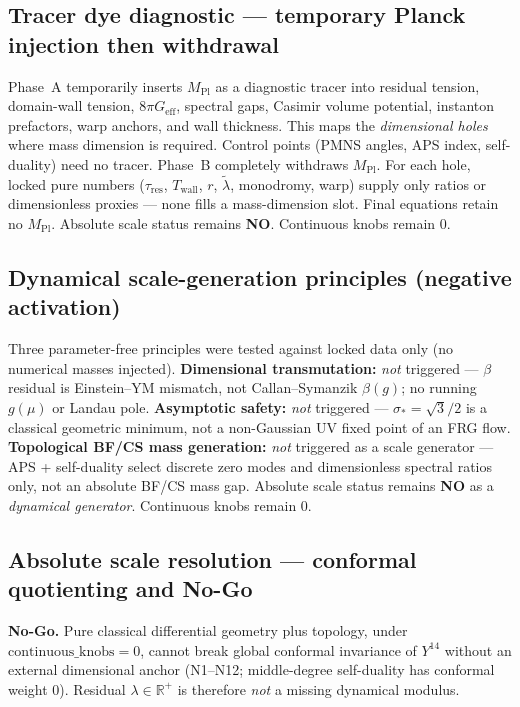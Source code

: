 \documentclass{article}
\begin{document}
\subsection{Tracer dye diagnostic --- temporary Planck injection then withdrawal}
Phase~A temporarily inserts $M_{\mathrm{Pl}}$ as a diagnostic tracer into residual
tension, domain-wall tension, $8\pi G_{\mathrm{eff}}$, spectral gaps, Casimir volume
potential, instanton prefactors, warp anchors, and wall thickness. This maps the
\emph{dimensional holes} where mass dimension is required. Control points (PMNS
angles, APS index, self-duality) need no tracer. Phase~B completely withdraws
$M_{\mathrm{Pl}}$. For each hole, locked pure numbers ($\tau_{\mathrm{res}}$,
$T_{\mathrm{wall}}$, $r$, $\tilde\lambda$, monodromy, warp) supply only ratios or
dimensionless proxies --- none fills a mass-dimension slot. Final equations retain
no $M_{\mathrm{Pl}}$. Absolute scale status remains \textbf{NO}. Continuous knobs remain 0.

\subsection{Dynamical scale-generation principles (negative activation)}
Three parameter-free principles were tested against locked data only (no numerical
masses injected). \textbf{Dimensional transmutation:} \emph{not} triggered ---
$\beta$ residual is Einstein--YM mismatch, not Callan--Symanzik $\beta(g)$; no
running $g(\mu)$ or Landau pole. \textbf{Asymptotic safety:} \emph{not} triggered ---
$\sigma_*=\sqrt3/2$ is a classical geometric minimum, not a non-Gaussian UV fixed
point of an FRG flow. \textbf{Topological BF/CS mass generation:} \emph{not}
triggered as a scale generator --- APS + self-duality select discrete zero modes
and dimensionless spectral ratios only, not an absolute BF/CS mass gap.
Absolute scale status remains \textbf{NO} as a \emph{dynamical generator}. Continuous knobs remain 0.

\subsection{Absolute scale resolution --- conformal quotienting and No-Go}
\textbf{No-Go.} Pure classical differential geometry plus topology, under
$\mathrm{continuous\_knobs}=0$, cannot break global conformal invariance of
$Y^{14}$ without an external dimensional anchor (N1--N12; middle-degree
self-duality has conformal weight $0$). Residual $\lambda\in\mathbb{R}^+$ is
therefore \emph{not} a missing dynamical modulus.
\end{document}
